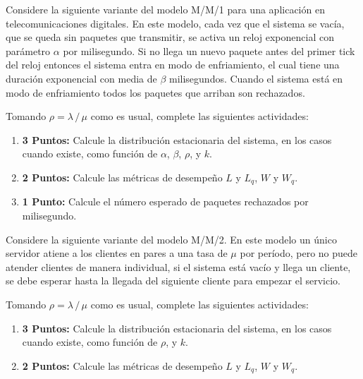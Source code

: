 \documentclass[ a4paper, twoside, 11pt]{article}
\begin{document}
\begin{problem}
Considere la siguiente variante del modelo M/M/1 para una aplicaci\'on en telecomunicaciones digitales. En este modelo, cada vez que el sistema se vac\'ia, \ie que se queda sin paquetes que transmitir, se activa un reloj exponencial con par\'ametro $\alpha$ por milisegundo. Si no llega un nuevo paquete antes del primer tick del reloj entonces el sistema entra en modo de enfriamiento, el cual tiene una duraci\'on exponencial con media de $\beta$ milisegundos. Cuando el sistema est\'a en modo de enfriamiento todos los paquetes que arriban son rechazados. 

\begin{figure}[htb]
\centering
\def\svgwidth{0.9\columnwidth}

\end{figure}
\halfskip

Tomando $\rho = \lambda \, / \, \mu$ como es usual, complete las siguientes actividades: 
\begin{enumerate}[label=\textbf{\alph*)}]
\item \textbf{3 Puntos:} Calcule la distribuci\'on estacionaria del sistema, en los casos cuando existe, como funci\'on de $\alpha$, $\beta$, $\rho$, y $k$. 
\item \textbf{2 Puntos:} Calcule las m\'etricas de desempe\~no $L$ y $L_q$, $W$ y $W_q$. 
\item \textbf{1 Punto:} Calcule el n\'umero esperado de paquetes rechazados por milisegundo. 
\end{enumerate}

\end{problem}
\vspace{\baselineskip}

\begin{problem}
Considere la siguiente variante del modelo M/M/2. En este modelo un \'unico servidor atiene a los clientes en pares a una tasa de $\mu$ por per\'iodo, pero no puede atender clientes de manera individual, \eg si el sistema est\'a vac\'io y llega un cliente, se debe esperar hasta la llegada del siguiente cliente para empezar el servicio. 

\begin{figure}[htb]
\centering
\def\svgwidth{0.9\columnwidth}

\end{figure}
\halfskip

Tomando $\rho = \lambda \, / \, \mu$ como es usual, complete las siguientes actividades: 
\begin{enumerate}[label=\textbf{\alph*)}]
\item \textbf{3 Puntos:} Calcule la distribuci\'on estacionaria del sistema, en los casos cuando existe, como funci\'on de $\rho$, y $k$. 
\item \textbf{2 Puntos:} Calcule las m\'etricas de desempe\~no $L$ y $L_q$, $W$ y $W_q$. 
\end{enumerate}

\end{problem}
\vspace{\baselineskip}
\end{document}
